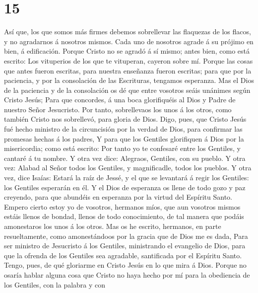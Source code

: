 \hypertarget{section-14}{%
\section{15}\label{section-14}}

 Así que, los que somos más firmes debemos sobrellevar las
flaquezas de los flacos, y no agradarnos á nosotros mismos. 
Cada uno de nosotros agrade á su prójimo en bien, á edificación.
 Porque Cristo no se agradó á sí mismo; antes bien, como
está escrito: Los vituperios de los que te vituperan, cayeron sobre mí.
 Porque las cosas que antes fueron escritas, para nuestra
enseñanza fueron escritas; para que por la paciencia, y por la
consolación de las Escrituras, tengamos esperanza.  Mas el
Dios de la paciencia y de la consolación os dé que entre vosotros seáis
unánimes según Cristo Jesús;  Para que concordes, á una boca
glorifiquéis al Dios y Padre de nuestro Señor Jesucristo. 
Por tanto, sobrellevaos los unos á los otros, como también Cristo nos
sobrellevó, para gloria de Dios.  Digo, pues, que Cristo
Jesús fué hecho ministro de la circuncisión por la verdad de Dios, para
confirmar las promesas hechas á los padres,  Y para que los
Gentiles glorifiquen á Dios por la misericordia; como está escrito: Por
tanto yo te confesaré entre los Gentiles, y cantaré á tu nombre.
 Y otra vez dice: Alegraos, Gentiles, con su pueblo.
 Y otra vez: Alabad al Señor todos los Gentiles, y
magnificadle, todos los pueblos.  Y otra vez, dice Isaías:
Estará la raíz de Jessé, y el que se levantará á regir los Gentiles: los
Gentiles esperarán en él.  Y el Dios de esperanza os llene
de todo gozo y paz creyendo, para que abundéis en esperanza por la
virtud del Espíritu Santo.  Empero cierto estoy yo de
vosotros, hermanos míos, que aun vosotros mismos estáis llenos de
bondad, llenos de todo conocimiento, de tal manera que podáis
amonestaros los unos á los otros.  Mas os he escrito,
hermanos, en parte resueltamente, como amonestándoos por la gracia que
de Dios me es dada,  Para ser ministro de Jesucristo á los
Gentiles, ministrando el evangelio de Dios, para que la ofrenda de los
Gentiles sea agradable, santificada por el Espíritu Santo. 
Tengo, pues, de qué gloriarme en Cristo Jesús en lo que mira á Dios.
 Porque no osaría hablar alguna cosa que Cristo no haya
hecho por mí para la obediencia de los Gentiles, con la palabra y con
